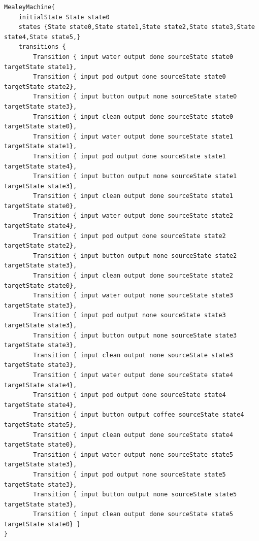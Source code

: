 \begin{lstlisting}[caption=The output MealyMachine after running the implemented DHC algorithm with the input seen in Listing \ref{li:coffeemealy}.,label=li:coffeedhcret,float,floatplacement=H]
MealeyMachine{
	initialState State state0
	states {State state0,State state1,State state2,State state3,State state4,State state5,}
	transitions {
		Transition { input water output done sourceState state0 targetState state1},
		Transition { input pod output done sourceState state0 targetState state2},
		Transition { input button output none sourceState state0 targetState state3},
		Transition { input clean output done sourceState state0 targetState state0},
		Transition { input water output done sourceState state1 targetState state1},
		Transition { input pod output done sourceState state1 targetState state4},
		Transition { input button output none sourceState state1 targetState state3},
		Transition { input clean output done sourceState state1 targetState state0},
		Transition { input water output done sourceState state2 targetState state4},
		Transition { input pod output done sourceState state2 targetState state2},
		Transition { input button output none sourceState state2 targetState state3},
		Transition { input clean output done sourceState state2 targetState state0},
		Transition { input water output none sourceState state3 targetState state3},
		Transition { input pod output none sourceState state3 targetState state3},
		Transition { input button output none sourceState state3 targetState state3},
		Transition { input clean output none sourceState state3 targetState state3},
		Transition { input water output done sourceState state4 targetState state4},
		Transition { input pod output done sourceState state4 targetState state4},
		Transition { input button output coffee sourceState state4 targetState state5},
		Transition { input clean output done sourceState state4 targetState state0},
		Transition { input water output none sourceState state5 targetState state3},
		Transition { input pod output none sourceState state5 targetState state3},
		Transition { input button output none sourceState state5 targetState state3},
		Transition { input clean output done sourceState state5 targetState state0} }
}
\end{lstlisting}

